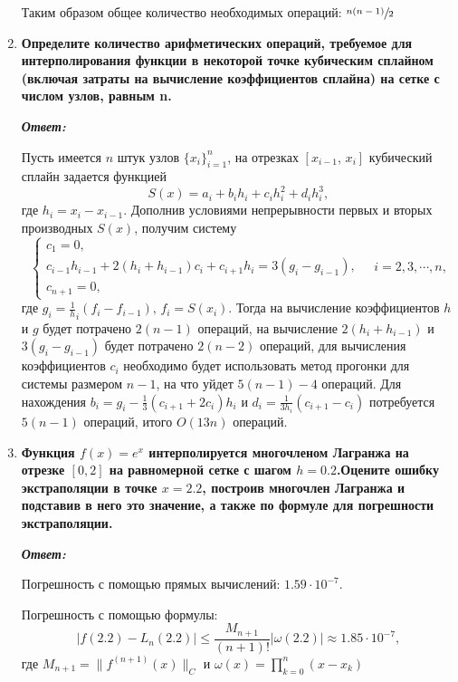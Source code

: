 \documentclass[12pt, a4paper]{article}
\newcommand{\norm}[1]{\lVert #1 \rVert}
\newcommand{\abs}[1]{\lvert #1 \rvert}
\begin{document}
\begin{enumerate}
	Таким образом общее количество необходимых операций: $\sfrac{n(n-1)}{2}$
	
	\item \textbf{Определите количество арифметических операций, требуемое для интерполирования функции в некоторой точке кубическим сплайном (включая затраты на вычисление коэффициентов сплайна) на сетке с числом узлов, равным n.}
	\vspace*{0.2cm}
	
	\textit{\textbf{Ответ:}}
	
	Пусть имеется $n$ штук узлов $\{ x_i\}_{i=1}^n$, на отрезках $[x_{i-1}, \, x_i]$ кубический сплайн задается функцией
$$
S(x) = a_i + b_i h_i + c_i h_i^2 + d_i h_i^3,
$$
где $h_i = x_i - x_{i- 1}$. Дополнив условиями непрерывности первых и вторых производных $S(x)$, получим систему
\begin{equation*}
	\begin{cases}
		c_1 = 0, \\
		c_{i - 1} h_{i -1} + 2 (h_i + h_{i-1}) c_i + c_{i+1} h_i = 3 (g_i - g_{i -1}), \\
		c_{n+1} = 0,
	\end{cases}
	\quad i = 2, 3, \dotsb, n,
\end{equation*}
где $g_i = \frac 1 h_i (f_i - f_{i - 1}), \, f_i = S(x_i)$. Тогда на вычисление коэффициентов $h$ и $g$ будет потрачено $2(n -1)$ операций, на вычисление $2(h_i + h_{i-1})$ и $3 (g_i - g_{i -1})$ будет потрачено $2(n - 2)$ операций, для вычисления коэффициентов $c_i$ необходимо будет использовать метод прогонки для системы размером $n - 1$, на что уйдет $5(n - 1) - 4$ операций. Для нахождения $b_i = g_i - \frac 1 3 (c_{i + 1} + 2 c_i) h_i$ и $d_i = \frac{1}{3 h_i} (c_{i + 1} - c_i)$ потребуется $5 (n - 1)$ операций, итого $O(13n)$ операций.

	\item \textbf{Функция $f(x) = e ^ x$ интерполируется многочленом Лагранжа на отрезке $[0, 2]$ на равномерной сетке с шагом $h=0.2$.Оцените ошибку экстраполяции в точке $x = 2.2$, построив многочлен Лагранжа и подставив в него это значение, а также по формуле для погрешности экстраполяции.}
	\vspace*{0.2cm}

	\textit{\textbf{Ответ:}}
	
	Погрешность с помощью прямых вычислений: $1.59 \cdot 10^{-7}$.
	
	Погрешность с помощью формулы:
	\[
	\abs{f(2.2) - L_n(2.2)} \le \dfrac{M_{n+1}}{(n+1)!}\abs{\omega(2.2)} \approx 1.85 \cdot 10^{-7},
	\]
	где $M_{n+1} = \norm{f^{(n+1)}(x)}_C$ и $\omega(x) = \prod\limits_{k=0}^{n}(x - x_k)$
	

\end{enumerate}
\end{document}
